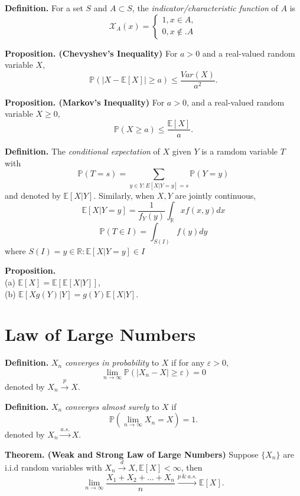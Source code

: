 \documentclass{article}[11pt]
\begin{document}
\textbf{Definition.} For a set $S$ and $A \subset S$, the \emph{indicator/characteristic function} of $A$ is 
\[
\mathcal{X}_A(x) = \begin{cases}
1, x \in A, \\
0, x \notin. A
\end{cases}
\]

\textbf{Proposition. (Chevyshev's Inequality)} For $a > 0$ and a real-valued random variable $X$,
$$\mathbb{P}(| X - \mathbb{E}[X]| \geq a) \leq \frac{Var(X)}{a^2}.$$

\textbf{Proposition. (Markov's Inequality)} For $a > 0$, and a real-valued random variable $X \geq 0$,
$$\mathbb{P}(X \geq a) \leq \frac{\mathbb{E}[X]}{a}.$$

\textbf{Definition.} The \emph{conditional expectation} of $X$ given $Y$ is a ramdom variable $T$ with
\[
  \mathbb{P}(T = s) = \sum_{y \in Y: E[X|Y = y] = s} \mathbb{P}(Y=y)  
\]
and denoted by $\mathbb{E}[X|Y].$ Similarly, when $X,Y$ are jointly continuous,
$$\mathbb{E}[X|Y=y] = \frac{1}{f_Y(y)}\int_{\mathbb{R}}xf(x,y)dx$$
\[
  \mathbb{P}(T\in I) = \int_{S(I)}f(y)dy
\]
where $S(I) = {y\in \mathbb{R}: \mathbb{E}}[X|Y = y] \in I$

\textbf{Proposition.} \\
(a) $\mathbb{E}[X] = \mathbb{E}[\mathbb{E}[X|Y]]$, \\
(b) $\mathbb{E}[Xg(Y)|Y] = g(Y)\mathbb{E}[X|Y]$.
\section{Law of Large Numbers}

\textbf{Definition.} $X_n$ \emph{converges in probability} to $X$ if
                     for any $\varepsilon > 0$,
                     $$\lim_{n \to \infty}\mathbb{P}(|X_n-X| \geq \varepsilon) = 0 $$
                     denoted by $X_n \xrightarrow{p} X $.

\par

\textbf{Definition.} $X_n$ \emph{converges almost surely} to $X$ if 
                     $$\mathbb{P}(\lim_{n \to \infty}X_n = X) = 1.$$
                     denoted by $X_n \xrightarrow{a.s.} X.$

\textbf{Theorem. (Weak and Strong Law of Large Numbers)} Suppose $\{X_n\}$ are i.i.d random variables with $X_n \xrightarrow{d} X, \mathbb{E}[X] < \infty$, then
$$\lim_{n \to \infty}\frac{X_1 + X_2 + \dots +X_n}{n} \xrightarrow{p \ \& \ a.s.} \mathbb{E}[X].$$
\end{document}
